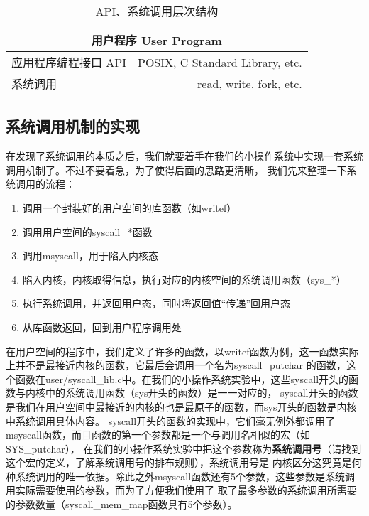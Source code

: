 \begin{table}[htbp]
\centering
\caption{API、系统调用层次结构}
\label{fig:api-and-syscall}
\begin{tabular}{|lr|}
\hline
\multicolumn{2}{|c|}{用户程序 User Program}        \\ \hline
应用程序编程接口 API & POSIX, C Standard Library, etc. \\ \hline
系统调用         & read, write, fork, etc.         \\ \hline
\end{tabular}
\end{table}

\newpage

\subsection{系统调用机制的实现}
在发现了系统调用的本质之后，我们就要着手在我们的小操作系统中实现一套系统调用机制了。不过不要着急，为了使得后面的思路更清晰，
我们先来整理一下系统调用的流程：
\begin{enumerate}
  \item 调用一个封装好的用户空间的库函数（如writef）
  \item 调用用户空间的syscall\_*函数
  \item 调用msyscall，用于陷入内核态
  \item 陷入内核，内核取得信息，执行对应的内核空间的系统调用函数（sys\_*）
  \item 执行系统调用，并返回用户态，同时将返回值“传递”回用户态
  \item 从库函数返回，回到用户程序调用处
\end{enumerate}

在用户空间的程序中，我们定义了许多的函数，以writef函数为例，这一函数实际上并不是最接近内核的函数，它最后会调用一个名为syscall\_putchar
的函数，这个函数在user/syscall\_lib.c中。在我们的小操作系统实验中，这些syscall开头的函数与内核中的系统调用函数（sys开头的函数）是一一对应的，
syscall开头的函数是我们在用户空间中最接近的内核的也是最原子的函数，而sys开头的函数是内核中系统调用具体内容。
syscall开头的函数的实现中，它们毫无例外都调用了msyscall函数，而且函数的第一个参数都是一个与调用名相似的宏（如SYS\_putchar），
在我们的小操作系统实验中把这个参数称为\textbf{系统调用号}（请找到这个宏的定义，了解系统调用号的排布规则），系统调用号是
内核区分这究竟是何种系统调用的唯一依据。除此之外msyscall函数还有5个参数，这些参数是系统调用实际需要使用的参数，而为了方便我们使用了
取了最多参数的系统调用所需要的参数数量（syscall\_mem\_map函数具有5个参数）。

